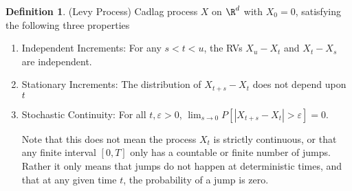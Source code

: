 \documentclass[12pt]{article}
\theoremstyle{plain}
\theoremstyle{definition}
\newtheorem{defn}[thm]{Definition}
\theoremstyle{remark}
\newcommand{\ra}{\rightarrow}
\begin{document}
\begin{defn}(Levy Process)
Cadlag process $X$ on $\R^d$ with $X_0=0$, satisfying the following three
properties
\begin{enumerate}[label=(\roman*)]
  \item Independent Increments:
    For any $s<t<u$, the RVs
    $X_u-X_t$ and $X_t-X_s$ are independent.
  \item Stationary Increments:
    The distribution of $X_{t+s}-X_t$ does not depend upon $t$
  \item Stochastic Continuity:
    For all $t,\varepsilon>0$,
    $\lim_{s\ra 0} P[|X_{t+s}-X_t|>\varepsilon]=0$.

    Note that this does not mean the process $X_t$ is strictly
    continuous, or that any finite interval $[0,T]$ only has a countable
    or finite number of jumps.
    Rather it only means that jumps do not happen at deterministic
    times, and that at any given time $t$, the probability of a jump is
    zero.
\end{enumerate}
\end{defn}




\end{document}
